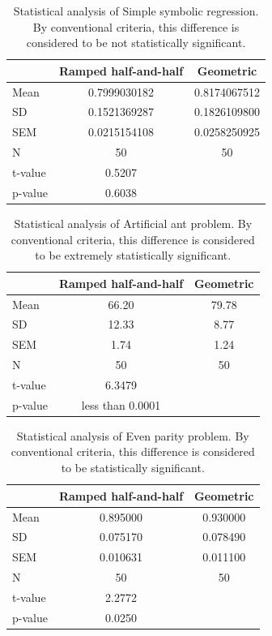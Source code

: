 \documentclass[conference]{IEEEtran}
\begin{document}
\begin{table}[t]
\centering
\begin{tabular}{|l|cc|}
\hline
& Ramped half-and-half & Geometric \\
\hline
Mean & 0.7999030182 & 0.8174067512 \\
SD	 & 0.1521369287	& 0.1826109800 \\
SEM	 & 0.0215154108	& 0.0258250925 \\
N	 & 50 & 50  \\
\hline
t-value & 0.5207 & \\
p-value & 0.6038 & \\
\hline
\end{tabular}
\caption{Statistical analysis of Simple symbolic regression.
By conventional criteria, this difference is considered to be not statistically significant.}
\end{table}

\begin{table}[t]
\centering
\begin{tabular}{|l|cc|}
\hline
& Ramped half-and-half & Geometric \\
\hline
Mean & 66.20 & 79.78 \\
SD	 & 12.33 & 8.77  \\
SEM	 & 1.74	 & 1.24  \\
N	 & 50    & 50    \\
\hline
t-value &  6.3479           & \\
p-value &  less than 0.0001 &  \\
\hline
\end{tabular}
\caption{Statistical analysis of Artificial ant problem.
 By conventional criteria, this difference is considered to be extremely statistically significant. }
\end{table}

\begin{table}[t]
\centering
\begin{tabular}{|l|cc|}
\hline
& Ramped half-and-half & Geometric \\
\hline
Mean & 0.895000	& 0.930000 \\
SD	 & 0.075170	& 0.078490 \\
SEM	 & 0.010631	& 0.011100 \\
N	 & 50    & 50    \\
\hline
t-value &  2.2772 & \\
p-value &  0.0250 &  \\
\hline
\end{tabular}
\caption{Statistical analysis of Even parity problem. 
By conventional criteria, this difference is considered to be statistically significant.}
\end{table}
\end{document}
